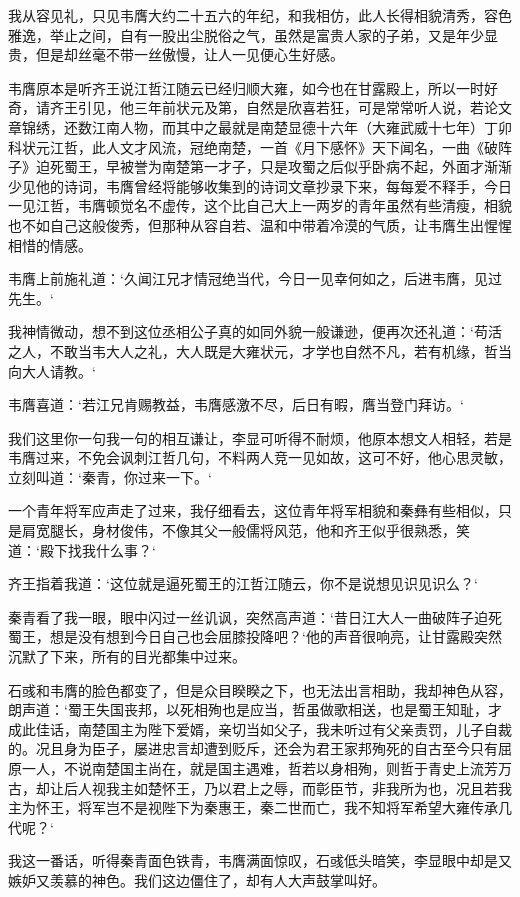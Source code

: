 我从容见礼，只见韦膺大约二十五六的年纪，和我相仿，此人长得相貌清秀，容色雅逸，举止之间，自有一股出尘脱俗之气，虽然是富贵人家的子弟，又是年少显贵，但是却丝毫不带一丝傲慢，让人一见便心生好感。

韦膺原本是听齐王说江哲江随云已经归顺大雍，如今也在甘露殿上，所以一时好奇，请齐王引见，他三年前状元及第，自然是欣喜若狂，可是常常听人说，若论文章锦绣，还数江南人物，而其中之最就是南楚显德十六年（大雍武威十七年）丁卯科状元江哲，此人文才风流，冠绝南楚，一首《月下感怀》天下闻名，一曲《破阵子》迫死蜀王，早被誉为南楚第一才子，只是攻蜀之后似乎卧病不起，外面才渐渐少见他的诗词，韦膺曾经将能够收集到的诗词文章抄录下来，每每爱不释手，今日一见江哲，韦膺顿觉名不虚传，这个比自己大上一两岁的青年虽然有些清瘦，相貌也不如自己这般俊秀，但那种从容自若、温和中带着冷漠的气质，让韦膺生出惺惺相惜的情感。

韦膺上前施礼道：‘久闻江兄才情冠绝当代，今日一见幸何如之，后进韦膺，见过先生。‘

我神情微动，想不到这位丞相公子真的如同外貌一般谦逊，便再次还礼道：‘苟活之人，不敢当韦大人之礼，大人既是大雍状元，才学也自然不凡，若有机缘，哲当向大人请教。‘

韦膺喜道：‘若江兄肯赐教益，韦膺感激不尽，后日有暇，膺当登门拜访。‘

我们这里你一句我一句的相互谦让，李显可听得不耐烦，他原本想文人相轻，若是韦膺过来，不免会讽刺江哲几句，不料两人竞一见如故，这可不好，他心思灵敏，立刻叫道：‘秦青，你过来一下。‘

一个青年将军应声走了过来，我仔细看去，这位青年将军相貌和秦彝有些相似，只是肩宽腿长，身材俊伟，不像其父一般儒将风范，他和齐王似乎很熟悉，笑道：‘殿下找我什么事？‘

齐王指着我道：‘这位就是逼死蜀王的江哲江随云，你不是说想见识见识么？‘

秦青看了我一眼，眼中闪过一丝讥讽，突然高声道：‘昔日江大人一曲破阵子迫死蜀王，想是没有想到今日自己也会屈膝投降吧？‘他的声音很响亮，让甘露殿突然沉默了下来，所有的目光都集中过来。

石彧和韦膺的脸色都变了，但是众目睽睽之下，也无法出言相助，我却神色从容，朗声道：‘蜀王失国丧邦，以死相殉也是应当，哲虽做歌相送，也是蜀王知耻，才成此佳话，南楚国主为陛下爱婿，亲切当如父子，我未听过有父亲责罚，儿子自裁的。况且身为臣子，屡进忠言却遭到贬斥，还会为君王家邦殉死的自古至今只有屈原一人，不说南楚国主尚在，就是国主遇难，哲若以身相殉，则哲于青史上流芳万古，却让后人视我主如楚怀王，乃以君上之辱，而彰臣节，非我所为也，况且若我主为怀王，将军岂不是视陛下为秦惠王，秦二世而亡，我不知将军希望大雍传承几代呢？‘

我这一番话，听得秦青面色铁青，韦膺满面惊叹，石彧低头暗笑，李显眼中却是又嫉妒又羡慕的神色。我们这边僵住了，却有人大声鼓掌叫好。

